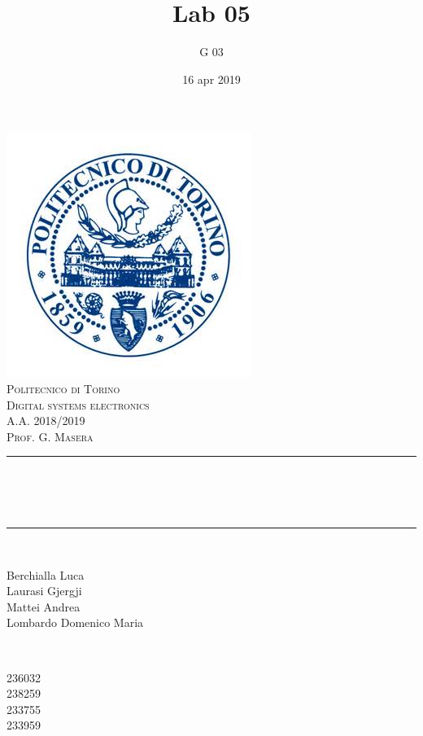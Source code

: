 \documentclass[12pt]{article}
\title{Lab 05}													%
\author{G 03}														%
\date{16 apr 2019}														%
\makeatletter
\let\thetitle\@title
\let\thedate\@date
\makeatother
\begin{document}

\begin{titlepage}
	\centering
    \vspace*{0.5 cm}
    \includegraphics[scale = 0.75]{polito.jpg}\\[1.0 cm]				%
    \textsc{\LARGE Politecnico di Torino}\\[2.0 cm]						%
	\textsc{\Large Digital systems electronics\\ A.A. 2018/2019}\\[0.5 cm]		%
	\textsc{\Large Prof. G. Masera}\\[0.5 cm]		%
	\rule{\linewidth}{0.2 mm} \\[0.4 cm]
	{ \huge \bfseries \thetitle \\ \small \thedate}\\
	\rule{\linewidth}{0.2 mm} \\[1.5 cm]
	
	\begin{minipage}{0.4\textwidth}
		\begin{flushleft} \large
			Berchialla Luca\\												%
			Laurasi Gjergji
			\\
			
			Mattei Andrea\\
            Lombardo Domenico Maria\\
            
			\end{flushleft}
			\end{minipage}~
			\begin{minipage}{0.4\textwidth}
            
			\begin{flushright} \large
			236032\\													%
			238259\\
            233755\\
            233959\\
            
		\end{flushright}
        
	\end{minipage}\\[2 cm]
	
\end{titlepage}
\end{document}

